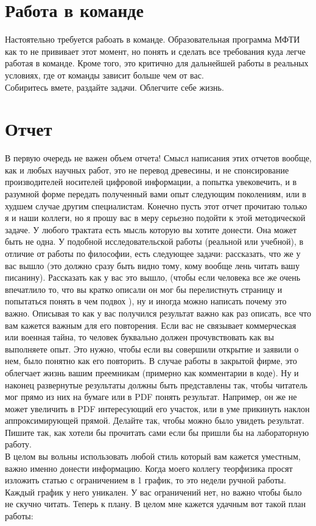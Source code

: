 \documentclass[a4paper,12pt]{article} %
\begin{document}
\section{Работа в команде}
Настоятельно требуется рабоать в команде. Образовательная программа МФТИ как то не прививает этот момент, но понять и сделать все требования куда легче работая в команде. Кроме того, это критично для дальнейшей работы в реальных условиях, где от команды зависит больше чем от вас.\\
Собиритесь вмете, раздайте задачи. Облегчите себе жизнь.


\section{Отчет}
В первую очередь не важен объем отчета! Смысл написания этих отчетов вообще, как и любых научных работ, это не перевод древесины, и не спонсирование производителей носителей цифровой информации, а попытка увековечить, и в разумной форме передать полученный вами опыт следующим поколениям, или в худшем случае другим специалистам. Конечно пусть этот отчет прочитаю только я и наши коллеги, но я прошу вас в меру серьезно подойти к этой методической задаче. У любого трактата есть мысль которую вы хотите донести. Она может быть не одна. У подобной исследовательской работы (реальной или учебной), в отличие от работы по философии, есть следующее задачи: рассказать, что же у вас вышло (это должно сразу быть видно тому, кому вообще лень читать вашу писанину). Рассказать как у вас это вышло,  (чтобы если человека все же очень впечатлило то, что вы кратко описали он мог бы перелистнуть страницу и попытаться понять в чем подвох ), ну и иногда можно написать почему это важно. Описывая то как у вас получился результат важно как раз описать, все что вам кажется важным для его повторения. Если вас не связывает коммерческая или военная тайна, то человек буквально должен прочувствовать как вы выполняете опыт. Это нужно, чтобы если вы совершили открытие и заявили о нем, было понятно как его повторить. В случае работы в закрытой фирме,  это облегчает жизнь вашим преемникам (примерно как комментарии в коде). Ну и наконец развернутые результаты должны быть представлены так, чтобы читатель мог прямо из них на бумаге или в PDF понять результат. Например, он же не может увеличить в PDF интересующий его участок, или в уме прикинуть наклон аппроксимирующей прямой. Делайте так, чтобы можно было увидеть результат. Пишите так, как хотели бы прочитать сами если бы пришли бы на лабораторную работу.\\
В целом вы вольны использовать любой стиль который вам кажется уместным, важно именно донести информацию. Когда моего коллегу теорфизика просят изложить статью с ограничением в 1 график, то это недели ручной работы. Каждый график у него уникален. У вас ограничений нет, но важно чтобы было не скучно читать. Теперь к плану.
В целом мне кажется удачным вот такой план работы:
\end{document}
